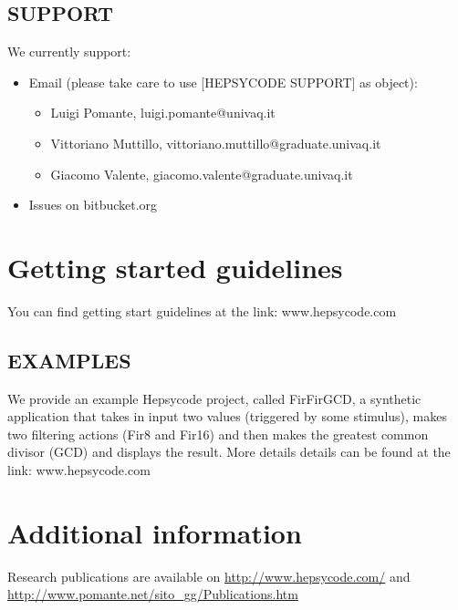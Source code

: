 \begin{appendices}
\subsection{SUPPORT}
%
We currently support:
%
\begin{itemize}
    \item Email (please take care to use [HEPSYCODE SUPPORT] as object):
    \begin{itemize}
        \item Luigi Pomante, luigi.pomante@univaq.it
        \item Vittoriano Muttillo, vittoriano.muttillo@graduate.univaq.it
        \item Giacomo Valente, giacomo.valente@graduate.univaq.it
    \end{itemize}
    \item Issues on bitbucket.org
\end{itemize}
%
\section{Getting started guidelines}
%
You can find getting start guidelines at the link: www.hepsycode.com
%
\subsection{EXAMPLES}
We provide an example Hepsycode project, called FirFirGCD, a synthetic application that takes in input two values (triggered by some stimulus), makes two filtering actions (Fir8 and Fir16) and then makes the greatest common divisor (GCD) and displays the result. More details details can be found at the link: www.hepsycode.com
%
\section{Additional information}
Research publications are available on \url{http://www.hepsycode.com/} and \url{http://www.pomante.net/sito\_gg/Publications.htm}
%

\begin{comment}


\end{comment}
\end{appendices}
